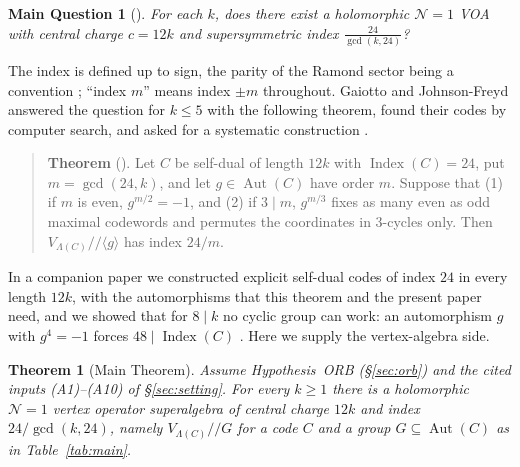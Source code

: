 \documentclass[11pt]{amsart}
\newtheorem{theorem}{Theorem}[section]
\newtheorem*{mainq}{Main Question}
\theoremstyle{definition}
\newcommand{\cN}{\mathcal N}
\newcommand{\Index}{\operatorname{Index}}
\newcommand{\Aut}{\operatorname{Aut}}
\newcommand{\orb}{/\!\!/}
\begin{document}
\begin{mainq}[{\cite[\S0, \S5]{GJF}}]
For each $k$, does there exist a holomorphic $\cN=1$ VOA with central charge $c=12k$ and
supersymmetric index $\frac{24}{\gcd(k,24)}$?
\end{mainq}

The index is defined up to sign, the parity of the Ramond sector being a convention
\cite[Rem.~5.3]{GJF}; ``index $m$'' means index $\pm m$ throughout. Gaiotto and Johnson-Freyd answered
the question for $k\le5$ with the following theorem, found their codes by computer search, and asked for
a systematic construction \cite[Question~0.1, Thm.~5.6, Ex.~5.7]{GJF}.

\begin{quote}
\textbf{Theorem} (\cite[Thm.~5.6]{GJF}). Let $C$ be self-dual of length $12k$ with $\Index(C)=24$,
put $m=\gcd(24,k)$, and let $g\in\Aut(C)$ have order $m$. Suppose that (1) if $m$ is even,
$g^{m/2}=-1$, and (2) if $3\mid m$, $g^{m/3}$ fixes as many even as odd maximal codewords and permutes
the coordinates in $3$-cycles only. Then $V_{\Lambda(C)}\orb\langle g\rangle$ has index $24/m$.
\end{quote}

In a companion paper \cite{I} we constructed explicit self-dual codes of index $24$ in every length
$12k$, with the automorphisms that this theorem and the present paper need, and we showed that for
$8\mid k$ no cyclic group can work: an automorphism $g$ with $g^4=-1$ forces $48\mid\Index(C)$
\cite[Thm.~D]{I}. Here we supply the vertex-algebra side.

\begin{theorem}[Main Theorem]\label{thm:main}
Assume Hypothesis~ORB (\S\ref{sec:orb}) and the cited inputs (A1)--(A10) of \S\ref{sec:setting}. For
every $k\ge1$ there is a holomorphic $\cN=1$ vertex operator superalgebra of central charge $12k$ and
index $24/\gcd(k,24)$, namely $V_{\Lambda(C)}\orb G$ for a code $C$ and a group $G\subseteq\Aut(C)$ as in
Table~\ref{tab:main}.
\end{theorem}
\end{document}
